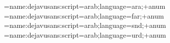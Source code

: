 

\font\testa={name:dejavusans:script=arab;language=ara;+anum}
\font\testp={name:dejavusans:script=arab;language=far;+anum}
\font\tests={name:dejavusans:script=arab;language=snd;+anum}
\font\testu={name:dejavusans:script=arab;language=urd;+anum}

\par
{}\par
{}\par
{}\par
\bye
